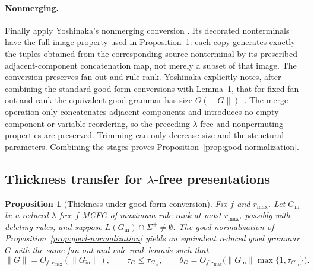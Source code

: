 \documentclass[11pt]{article}
\numberwithin{equation}{section}
\theoremstyle{plain}
\newtheorem{proposition}[theorem]{Proposition}
\theoremstyle{definition}
\theoremstyle{remark}
\begin{document}
\paragraph{Nonmerging.}
Finally apply Yoshinaka's nonmerging conversion
\cite[Section~2.3, Lemma~1]{Yoshinaka2011}.  Its decorated nonterminals have
the full-image property used in Proposition~\ref{prop:structural-good-thickness}:
each copy generates exactly the tuples obtained from the corresponding source
nonterminal by its prescribed adjacent-component concatenation map, not merely
a subset of that image.  The conversion preserves fan-out and rule rank.  Yoshinaka explicitly notes,
after combining the standard good-form conversions with Lemma~1, that for
fixed fan-out and rank the equivalent good grammar has size
$O(\|G\|)$~\cite[Section~2.3, immediately after Lemma~1]{Yoshinaka2011}.
The merge operation only concatenates adjacent components and introduces no
empty component or variable reordering, so the preceding $\lambda$-free and
nonpermuting properties are preserved.  Trimming can only decrease size and
the structural parameters.  Combining the stages proves
Proposition~\ref{prop:good-normalization}.

\subsection*{Thickness transfer for $\lambda$-free presentations}

\begin{proposition}[Thickness under good-form conversion]
\label{prop:structural-good-thickness}
Fix $f$ and $r_{\max}$.  Let $G_{\mathrm{in}}$ be a reduced $\lambda$-free
$f$-MCFG of maximum rule rank at most $r_{\max}$, possibly with deleting
rules, and suppose $L(G_{\mathrm{in}})\cap\Sigma^+\neq\emptyset$.  The good
normalization of Proposition~\ref{prop:good-normalization} yields an equivalent
reduced good grammar $G$ with the same fan-out and rule-rank bounds such that
\[
  \|G\|=O_{f,r_{\max}}(\|G_{\mathrm{in}}\|),\qquad
  \tau_G\le \tau_{G_{\mathrm{in}}},\qquad
  \theta_G=O_{f,r_{\max}}\!\bigl(
     \|G_{\mathrm{in}}\|\max\{1,\tau_{G_{\mathrm{in}}}\}\bigr).
\]
\end{proposition}
\end{document}
